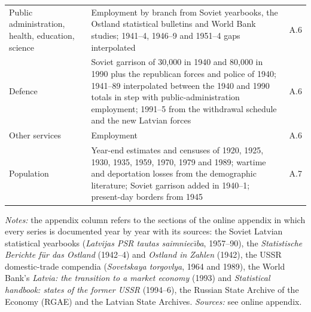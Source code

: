 \begin{table}[htbp]
\begin{threeparttable}
\begin{tabular}{p{2.9cm}p{11.3cm}c}
Public administration, health, education, science & Employment by branch from Soviet yearbooks, the Ostland statistical bulletins and World Bank studies; 1941--4, 1946--9 and 1951--4 gaps interpolated & A.6 \\
Defence & Soviet garrison of 30,000 in 1940 and 80,000 in 1990 plus the republican forces and police of 1940; 1941--89 interpolated between the 1940 and 1990 totals in step with public-administration employment; 1991--5 from the withdrawal schedule and the new Latvian forces & A.6 \\
Other services & Employment & A.6 \\
Population & Year-end estimates and censuses of 1920, 1925, 1930, 1935, 1959, 1970, 1979 and 1989; wartime and deportation losses from the demographic literature; Soviet garrison added in 1940--1; present-day borders from 1945 & A.7 \\
\bottomrule
\end{tabular}
\begin{tablenotes}
\footnotesize
\textit{Notes:} the appendix column refers to the sections of the online appendix in which every series is documented year by year with its sources: the Soviet Latvian statistical yearbooks (\textit{Latvijas PSR tautas saimniec\={\i}ba}, 1957--90), the \textit{Statistische Berichte f\"{u}r das Ostland} (1942--4) and \textit{Ostland in Zahlen} (1942), the USSR domestic-trade compendia (\textit{Sovetskaya torgovlya}, 1964 and 1989), the World Bank's \textit{Latvia: the transition to a market economy} (1993) and \textit{Statistical handbook: states of the former USSR} (1994--6), the Russian State Archive of the Economy (RGAE) and the Latvian State Archives. \textit{Sources:} see online appendix.
\end{tablenotes}
\end{threeparttable}
\end{table}
